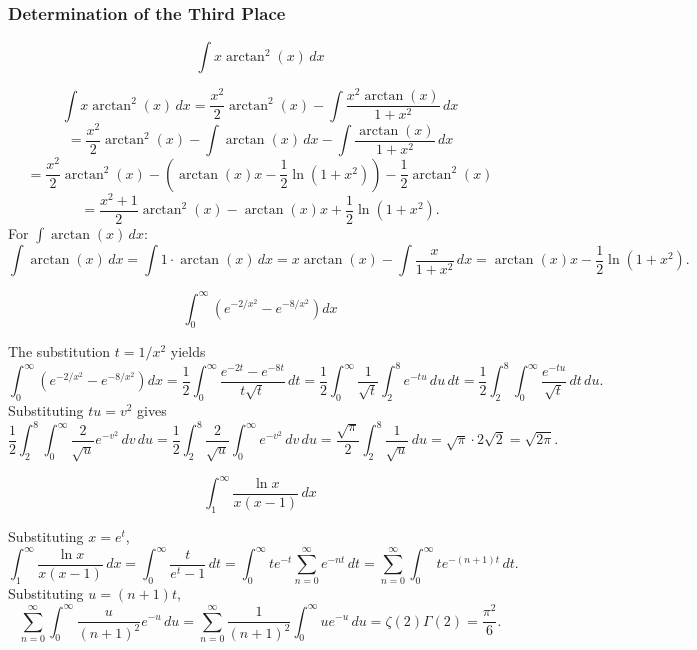 \subsubsection*{Determination of the Third Place}
\begin{questions}

\question
\[ \int x\arctan^2(x)\, dx \]
\begin{solution}
\[ \int x\arctan^2(x)\, dx = \frac{x^2}{2}\arctan^2(x) - \int \frac{x^2\arctan(x)}{1+x^2}\, dx \]
\[ = \frac{x^2}{2}\arctan^2(x) - \int \arctan(x)\, dx - \int \frac{\arctan(x)}{1+x^2}\, dx \]
\[ = \frac{x^2}{2}\arctan^2(x) - \left(\arctan(x)x - \frac{1}{2}\ln(1+x^2)\right) - \frac{1}{2}\arctan^2(x) \]
\[ = \frac{x^2+1}{2}\arctan^2(x) - \arctan(x)x + \frac{1}{2}\ln(1+x^2). \]
For $\int \arctan(x)\, dx$:
\[ \int \arctan(x)\, dx = \int 1\cdot \arctan(x)\, dx = x\arctan(x) - \int \frac{x}{1+x^2}\, dx = \arctan(x)x - \frac{1}{2}\ln(1+x^2). \]
\end{solution}

\question
\[ \int_0^\infty \left(e^{-2/x^2} - e^{-8/x^2}\right) dx \]
\begin{solution}
The substitution $t=1/x^2$ yields
\[ \int_0^\infty \left(e^{-2/x^2} - e^{-8/x^2}\right) dx = \frac{1}{2}\int_0^\infty \frac{e^{-2t}-e^{-8t}}{t\sqrt{t}}\, dt = \frac{1}{2}\int_0^\infty \frac{1}{\sqrt{t}}\int_2^8 e^{-tu}\, du\, dt = \frac{1}{2}\int_2^8\int_0^\infty \frac{e^{-tu}}{\sqrt{t}}\, dt\, du. \]
Substituting $tu=v^2$ gives
\[ \frac{1}{2}\int_2^8 \int_0^\infty \frac{2}{\sqrt{u}}e^{-v^2}\, dv\, du = \frac{1}{2}\int_2^8 \frac{2}{\sqrt{u}}\int_0^\infty e^{-v^2}\, dv\, du = \frac{\sqrt{\pi}}{2}\int_2^8 \frac{1}{\sqrt{u}}\, du = \sqrt{\pi}\cdot 2\sqrt{2} = \sqrt{2\pi}. \]
\end{solution}

\question
\[ \int_1^\infty \frac{\ln x}{x(x-1)}\, dx \]
\begin{solution}
Substituting $x=e^t$,
\[ \int_1^\infty \frac{\ln x}{x(x-1)}\, dx = \int_0^\infty \frac{t}{e^t-1}\, dt = \int_0^\infty t e^{-t}\sum_{n=0}^\infty e^{-nt}\, dt = \sum_{n=0}^\infty \int_0^\infty t e^{-(n+1)t}\, dt. \]
Substituting $u=(n+1)t$,
\[ \sum_{n=0}^\infty \int_0^\infty \frac{u}{(n+1)^2}e^{-u}\, du = \sum_{n=0}^\infty \frac{1}{(n+1)^2}\int_0^\infty u e^{-u}\, du = \zeta(2)\Gamma(2) = \frac{\pi^2}{6}. \]
\end{solution}


\end{questions}
